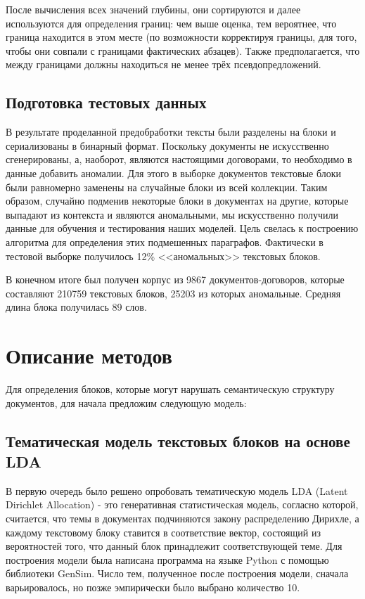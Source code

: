 \documentclass[12pt]{article}
\begin{document}
После вычисления всех значений глубины, они сортируются и далее используются для определения границ: чем выше оценка, тем вероятнее, что граница находится в этом месте (по возможности корректируя границы, для того, чтобы они совпали с границами фактических абзацев). Также предполагается, что между границами должны находиться не менее трёх псевдопредложений.

\subsection{Подготовка тестовых данных}
В результате проделанной предобработки тексты были разделены на блоки и сериализованы в бинарный формат. Поскольку документы не искусственно сгенерированы, а, наоборот, являются настоящими договорами, то необходимо в данные добавить аномалии. Для этого в выборке документов текстовые блоки были равномерно заменены на случайные блоки из всей коллекции. Таким образом, случайно подменив некоторые блоки в документах на другие, которые выпадают из контекста и являются аномальными, мы искусственно получили данные для обучения и тестирования наших моделей. Цель свелась к построению алгоритма для определения этих подмешенных параграфов. Фактически в тестовой выборке получилось  12\% <<аномальных>> текстовых блоков.

В конечном итоге был получен корпус из 9867 документов-\linebreak договоров, которые составляют 210759 текстовых блоков, 25203 из которых аномальные. Средняя длина блока получилась 89 слов.

\newpage
\section{Описание методов}
Для определения блоков, которые могут нарушать семантическую структуру документов, для начала предложим следующую модель:

\subsection{Тематическая модель текстовых блоков на основе LDA}
В первую очередь было решено опробовать тематическую модель LDA (Latent Dirichlet Allocation) - это генеративная статистическая модель, согласно которой, считается, что темы в документах подчиняются закону распределению Дирихле, а каждому текстовому блоку ставится в соответствие вектор, состоящий из вероятностей того, что данный блок принадлежит соответствующей теме. Для построения модели была написана программа на языке Python с помощью библиотеки GenSim. Число тем, полученное после построения модели, сначала варьировалось, но позже эмпирически было выбрано количество 10. 
\end{document}
